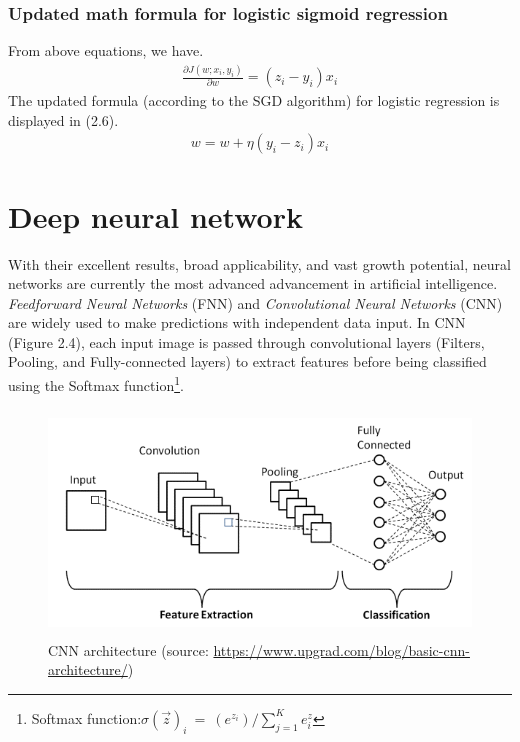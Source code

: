 \subsubsection{Updated math formula for logistic sigmoid regression}
\hspace{0.5cm}From above equations, we have.
\begin{align*}
    \frac{\partial J(w; x_i, y_i)}{\partial w} = (z_i - y_i)x_i 
\end{align*}
\hspace{0.5cm}The updated formula (according to the SGD algorithm) for logistic regression is displayed in (2.6).
\begin{align}
    w = w + \eta(y_i - z_i)x_i
\end{align}


\section{Deep neural network}
\label{sec:deep_neural_network}
\hspace{0.5cm}With their excellent results, broad applicability, and vast growth potential, neural networks are currently the most advanced advancement in artificial intelligence. \textit{Feedforward Neural Networks }(FNN) and \textit{Convolutional Neural Networks} (CNN) are widely used to make predictions with independent data input. In CNN (Figure 2.4), each input image is passed through convolutional layers (Filters, Pooling, and Fully-connected layers) to extract features before being classified using the Softmax function\footnote{Softmax function:$ \sigma (\overrightarrow{z})_i \: = \: (e^{z_i})/ \sum_{j=1}^{K} e^z_i  $}.
\begin{figure}[h!] 
	\centering
	\includegraphics[width=\linewidth, height=6cm,keepaspectratio]{figures/CNN.png}
	\caption{CNN architecture (source: \url{https://www.upgrad.com/blog/basic-cnn-architecture/})}
\end{figure}	

